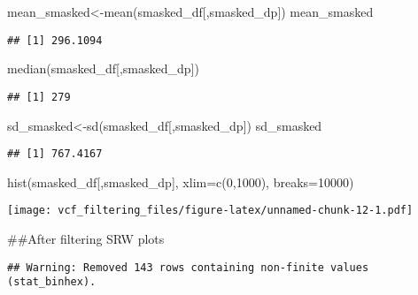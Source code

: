 \documentclass[
]{article}
\newenvironment{Shaded}{\begin{snugshade}}{\end{snugshade}}
\newcommand{\AttributeTok}[1]{\textcolor[rgb]{0.77,0.63,0.00}{#1}}
\newcommand{\DecValTok}[1]{\textcolor[rgb]{0.00,0.00,0.81}{#1}}
\newcommand{\FunctionTok}[1]{\textcolor[rgb]{0.00,0.00,0.00}{#1}}
\newcommand{\NormalTok}[1]{#1}
\newcommand{\OtherTok}[1]{\textcolor[rgb]{0.56,0.35,0.01}{#1}}
\newcommand{\StringTok}[1]{\textcolor[rgb]{0.31,0.60,0.02}{#1}}
\begin{document}
\begin{Shaded}
\begin{Highlighting}[]
\NormalTok{mean\_smasked}\OtherTok{\textless{}{-}}\FunctionTok{mean}\NormalTok{(smasked\_df[,}\StringTok{\textquotesingle{}smasked\_dp\textquotesingle{}}\NormalTok{])}
\NormalTok{mean\_smasked}
\end{Highlighting}
\end{Shaded}

\begin{verbatim}
## [1] 296.1094
\end{verbatim}

\begin{Shaded}
\begin{Highlighting}[]
\FunctionTok{median}\NormalTok{(smasked\_df[,}\StringTok{\textquotesingle{}smasked\_dp\textquotesingle{}}\NormalTok{])}
\end{Highlighting}
\end{Shaded}

\begin{verbatim}
## [1] 279
\end{verbatim}

\begin{Shaded}
\begin{Highlighting}[]
\NormalTok{sd\_smasked}\OtherTok{\textless{}{-}}\FunctionTok{sd}\NormalTok{(smasked\_df[,}\StringTok{\textquotesingle{}smasked\_dp\textquotesingle{}}\NormalTok{])}
\NormalTok{sd\_smasked}
\end{Highlighting}
\end{Shaded}

\begin{verbatim}
## [1] 767.4167
\end{verbatim}

\begin{Shaded}
\begin{Highlighting}[]
\FunctionTok{hist}\NormalTok{(smasked\_df[,}\StringTok{\textquotesingle{}smasked\_dp\textquotesingle{}}\NormalTok{], }\AttributeTok{xlim=}\FunctionTok{c}\NormalTok{(}\DecValTok{0}\NormalTok{,}\DecValTok{1000}\NormalTok{), }\AttributeTok{breaks=}\DecValTok{10000}\NormalTok{)}
\end{Highlighting}
\end{Shaded}

\texttt{[image: vcf\_filtering\_files/figure-latex/unnamed-chunk-12-1.pdf]}

\#\#After filtering SRW plots

\begin{verbatim}
## Warning: Removed 143 rows containing non-finite values (stat_binhex).
\end{verbatim}
\end{document}
